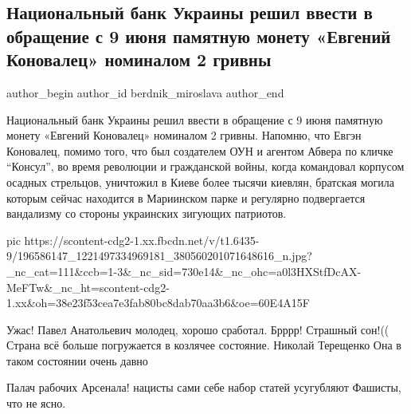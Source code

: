  
 
 
 
 
 
\subsection{Национальный банк Украины решил ввести в обращение с 9 июня памятную монету «Евгений Коновалец» номиналом 2 гривны}
\label{sec:07_06_2021.fb.berdnik_miroslava.4.konovalec_moneta}
\ifcmt
 author_begin
   author_id berdnik_miroslava
 author_end
\fi

Национальный банк Украины решил ввести в обращение с 9 июня памятную монету
«Евгений Коновалец» номиналом 2 гривны.  Напомню, что Евгэн Коновалец, помимо
того, что был создателем ОУН и агентом Абвера по кличке \enquote{Консул}, во время
революции и гражданской войны, когда командовал корпусом осадных стрельцов,
уничтожил в Киеве более тысячи киевлян, братская могила которым сейчас
находится в Мариинском парке и регулярно подвергается вандализму со стороны
украинских зигующих патриотов.

\ifcmt
  pic https://scontent-cdg2-1.xx.fbcdn.net/v/t1.6435-9/196586147_1221497334969181_380560201071648616_n.jpg?_nc_cat=111&ccb=1-3&_nc_sid=730e14&_nc_ohc=a0l3HXStfDcAX-MeFTw&_nc_ht=scontent-cdg2-1.xx&oh=38e23f53cea7e3fab80bc8dab70aa3b6&oe=60E4A15F
\fi

\begin{itemize}
Ужас!
Павел Анатольевич молодец, хорошо сработал.
Брррр! Страшный сон!((
Страна всё больше погружается в козлячее состояние.
Николай Терещенко Она в таком состоянии очень давно

Палач рабочих Арсенала!
нацисты сами себе набор статей усугубляют
Фашисты, что не ясно.
\end{itemize}

